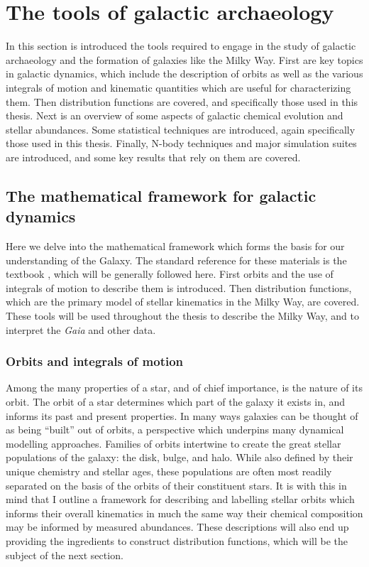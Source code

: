 \section{The tools of galactic archaeology}

In this section is introduced the tools required to engage in the study of galactic archaeology and the formation of galaxies like the Milky Way. First are key topics in galactic dynamics, which include the description of orbits as well as the various integrals of motion and kinematic quantities which are useful for characterizing them. Then distribution functions are covered, and specifically those used in this thesis. Next is an overview of some aspects of galactic chemical evolution and stellar abundances. Some statistical techniques are introduced, again specifically those used in this thesis. Finally, N-body techniques and major simulation suites are introduced, and some key results that rely on them are covered. 

\subsection{The mathematical framework for galactic dynamics}

Here we delve into the mathematical framework which forms the basis for our understanding of the Galaxy. The standard reference for these materials is the textbook \textcite{binney08}, which will be generally followed here. First orbits and the use of integrals of motion to describe them is introduced. Then distribution functions, which are the primary model of stellar kinematics in the Milky Way, are covered. These tools will be used throughout the thesis to describe the Milky Way, and to interpret the \textit{Gaia} and other data.

\subsubsection{Orbits and integrals of motion}

Among the many properties of a star, and of chief importance, is the nature of its orbit. The orbit of a star determines which part of the galaxy it exists in, and informs its past and present properties. In many ways galaxies can be thought of as being ``built'' out of orbits, a perspective which underpins many dynamical modelling approaches. Families of orbits intertwine to create the great stellar populations of the galaxy: the disk, bulge, and halo. While also defined by their unique chemistry and stellar ages, these populations are often most readily separated on the basis of the orbits of their constituent stars. It is with this in mind that I outline a framework for describing and labelling stellar orbits which informs their overall kinematics in much the same way their chemical composition may be informed by measured abundances. These descriptions will also end up providing the ingredients to construct distribution functions, which will be the subject of the next section.

